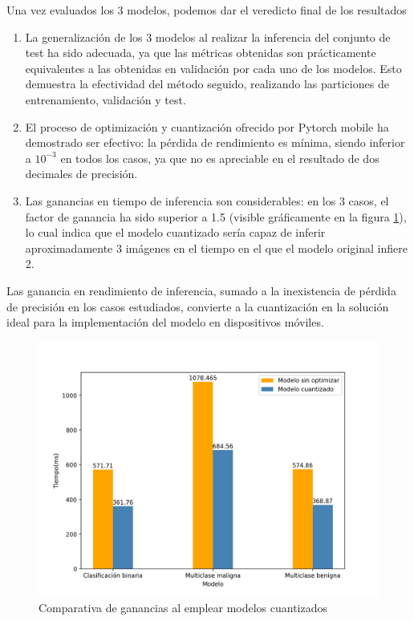 Una vez evaluados los 3 modelos, podemos dar el veredicto final de los resultados
\begin{enumerate}
	\item La generalización de los 3 modelos al realizar la inferencia del conjunto de test ha sido adecuada, ya que las métricas obtenidas son prácticamente equivalentes a las obtenidas en validación por cada uno de los modelos. Esto demuestra la efectividad del método seguido, realizando las particiones de entrenamiento, validación y test.
	\item El proceso de optimización y cuantización ofrecido por Pytorch mobile \cite{pmobile} ha demostrado ser efectivo: la pérdida de rendimiento es mínima, siendo inferior a $10^{-3}$ en todos los casos, ya que no es apreciable en el resultado de dos decimales de precisión.
	\item Las ganancias en tiempo de inferencia son considerables: en los 3 casos, el factor de ganancia ha sido superior a 1.5 (visible gráficamente en la figura \ref{fig:gananciasquant}), lo cual indica que el modelo cuantizado sería capaz de inferir aproximadamente 3 imágenes en el tiempo en el que el modelo original infiere 2. 
	\end{enumerate}
	
	Las ganancia en rendimiento de inferencia, sumado a la inexistencia de pérdida de precisión en los casos estudiados, convierte a la cuantización en la solución ideal para la implementación del modelo en dispositivos móviles.
	
	\begin{figure}[H]
		\centering
		\includegraphics[scale = 0.55]{imagenes/tiempoinferencia.png}
		\caption{Comparativa de ganancias al emplear  modelos cuantizados}
		\label{fig:gananciasquant}
	\end{figure}
